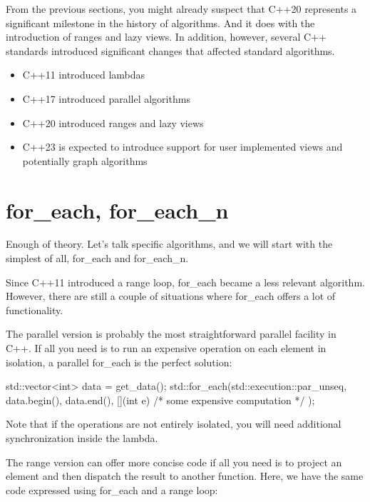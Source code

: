 From the previous sections, you might already suspect that C++20 represents a significant milestone in the history of algorithms. And it does with the introduction of ranges and lazy views. In addition, however, several C++ standards introduced significant changes that affected standard algorithms.

\begin{itemize}
    \item C++11 introduced lambdas
    \item C++17 introduced parallel algorithms
    \item C++20 introduced ranges and lazy views
    \item C++23 is expected to introduce support for user implemented views and potentially graph algorithms
\end{itemize}

\section{for\_each, for\_each\_n}

Enough of theory. Let’s talk specific algorithms, and we will start with the simplest of all, for\_each and for\_each\_n.


Since C++11 introduced a range loop, for\_each became a less relevant algorithm. However, there are still a couple of situations where for\_each offers a lot of functionality.

The parallel version is probably the most straightforward parallel facility in C++. If all you need is to run an expensive operation on each element in isolation, a parallel for\_each is the perfect solution:

\begin{box-note}
\begin{cppcode}
std::vector<int> data = get_data();
std::for_each(std::execution::par_unseq, 
    data.begin(), data.end(),
    [](int e) { /* some expensive computation */ });
\end{cppcode}
\end{box-note}

Note that if the operations are not entirely isolated, you will need additional synchronization inside the lambda.

The range version can offer more concise code if all you need is to project an element and then dispatch the result to another function. Here, we have the same code expressed using for\_each and a range loop:

